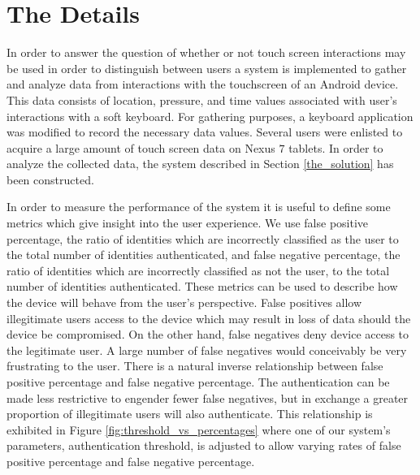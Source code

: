 \section{The Details}
\label{the_details}

In order to answer the question of
whether or not touch screen interactions may be used
in order to distinguish between users
a system is implemented to gather and analyze data
from interactions with the touchscreen of an Android device.
This data consists of location, pressure, and time
values associated with user's interactions with a soft keyboard.
%
For gathering purposes,
a keyboard application was modified to record
the necessary data values.
%
Several users were enlisted to acquire
a large amount of touch screen data on Nexus $7$ tablets.
%
In order to analyze the collected data,
the system described in Section \ref{the_solution}
has been constructed.

In order to measure the performance of the system
it is useful to define some metrics
which give insight into the user experience.
%
We use false positive percentage,
the ratio of identities which are incorrectly classified as the user
to the total number of identities authenticated,
and
false negative percentage,
the ratio of identities which are incorrectly classified as not the user,
to the total number of identities authenticated.
%
These metrics can be used to describe how the device will
behave from the user's perspective.
%
False positives allow illegitimate users access to the device
which may result in loss of data should the device be compromised.
%
On the other hand,
false negatives deny device access to the legitimate user.
A large number of false negatives would conceivably 
be very frustrating to the user.
%
There is a natural inverse relationship between
false positive percentage and false negative percentage.
The authentication can be made less restrictive to 
engender fewer false negatives, but
in exchange a greater proportion of
illegitimate users will also authenticate.
%
This relationship is exhibited in Figure \ref{fig:threshold_vs_percentages}
where one of our system's parameters, authentication threshold, 
is adjusted to allow varying rates 
of false positive percentage and false negative percentage.

